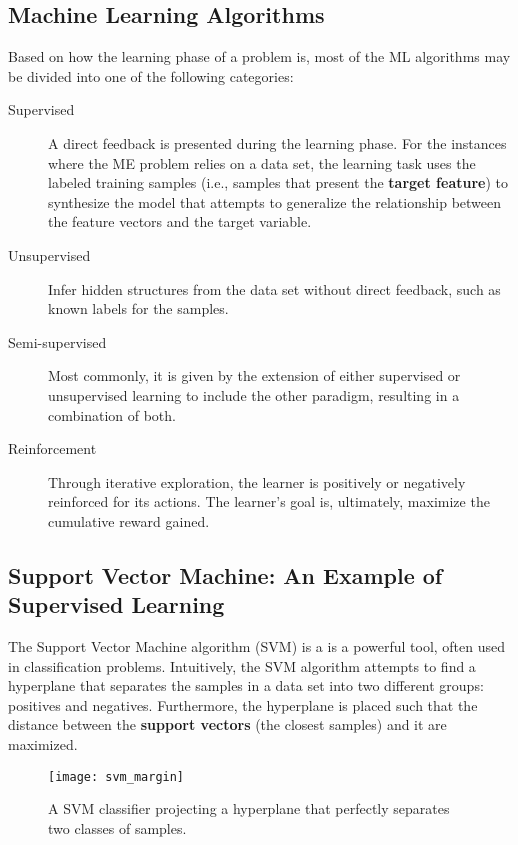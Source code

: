 \subsection{Machine Learning Algorithms}

Based on how the learning phase of a problem is, most of the ML algorithms may be divided into one of the following categories:

\begin{description}
	\item[Supervised] A direct feedback is presented during the learning phase. \cite{pat1996} For the instances where the ME problem relies on a data set, the learning task uses the labeled training samples (i.e., samples that present the \textbf{target feature}) to synthesize the model that attempts to generalize the relationship between the feature vectors and the target variable. \cite{awa2015}

	\item[Unsupervised] Infer hidden structures from the data set without direct feedback, such as known labels for the samples. \cite{awa2015}

	\item[Semi-supervised] Most commonly, it is given by the extension of either supervised or unsupervised learning to include the other paradigm, resulting in a combination of both. \cite{zhu2009}

	\item[Reinforcement] Through iterative exploration, the learner is positively or negatively reinforced for its actions. The learner's goal is, ultimately, maximize the cumulative reward gained. \cite{awa2015}
\end{description}

\subsection{Support Vector Machine: An Example of Supervised Learning}

The Support Vector Machine algorithm (SVM) is a is a powerful tool, often used in classification problems. Intuitively, the SVM algorithm attempts to find a hyperplane that separates the samples in a data set into two different groups: positives and negatives. Furthermore, the hyperplane is placed such that the distance between the \textbf{support vectors} (the closest samples) and it are maximized.

\begin{figure}[H]
	\centering
	\captionsetup{justification=centering}

	\texttt{[image: svm\_margin]}
	\caption{A SVM classifier projecting a hyperplane that perfectly separates two classes of samples. \cite{sksvm}}
	\label{fig:svmmargin}
\end{figure}

